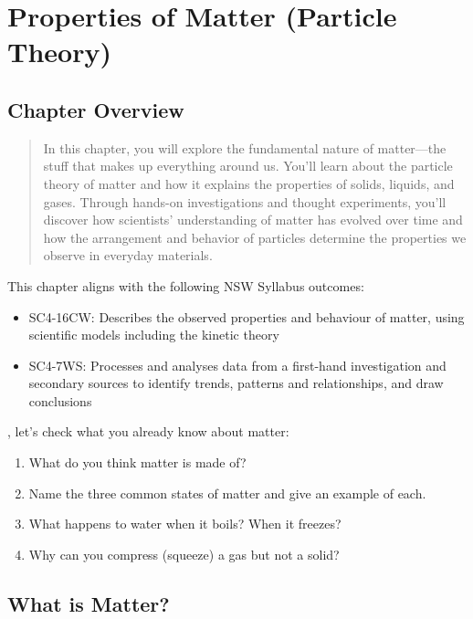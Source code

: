 \chapter{Properties of Matter (Particle Theory)}

\section*{Chapter Overview}

\begin{quote}
    In this chapter, you will explore the fundamental nature of matter—the stuff that makes up everything around us. You'll learn about the particle theory of matter and how it explains the properties of solids, liquids, and gases. Through hands-on investigations and thought experiments, you'll discover how scientists' understanding of matter has evolved over time and how the arrangement and behavior of particles determine the properties we observe in everyday materials.
\end{quote}

\noindent This chapter aligns with the following NSW Syllabus outcomes:
\begin{itemize}
    \item SC4-16CW: Describes the observed properties and behaviour of matter, using scientific models including the kinetic theory
    \item SC4-7WS: Processes and analyses data from a first-hand investigation and secondary sources to identify trends, patterns and relationships, and draw conclusions
\end{itemize}

, let's check what you already know about matter:

\begin{stopandthink}
\begin{enumerate}
    \item What do you think matter is made of?
    \item Name the three common states of matter and give an example of each.
    \item What happens to water when it boils? When it freezes?
    \item Why can you compress (squeeze) a gas but not a solid?
\end{enumerate}
\end{stopandthink}

\section{What is Matter?}


